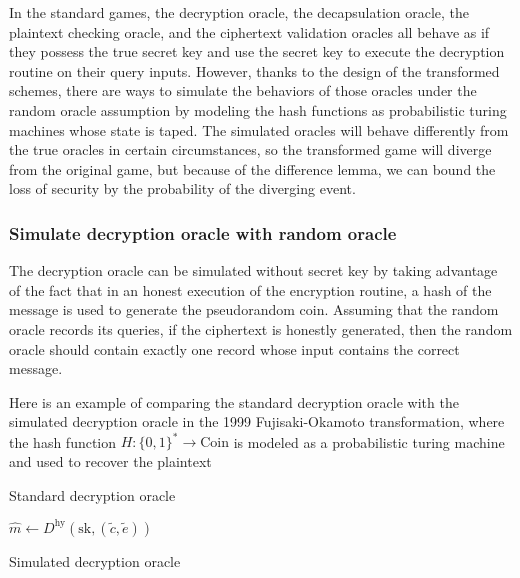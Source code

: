 \documentclass{article}
\begin{document}
In the standard games, the decryption oracle, the decapsulation oracle, the plaintext checking oracle, and the ciphertext validation oracles all behave as if they possess the true secret key and use the secret key to execute the decryption routine on their query inputs. However, thanks to the design of the transformed schemes, there are ways to simulate the behaviors of those oracles under the random oracle assumption by modeling the hash functions as probabilistic turing machines whose state is taped. The simulated oracles will behave differently from the true oracles in certain circumstances, so the transformed game will diverge from the original game, but because of the difference lemma, we can bound the loss of security by the probability of the diverging event.

\subsubsection{Simulate decryption oracle with random oracle}\label{simulate-dec-oracle}
The decryption oracle can be simulated without secret key by taking advantage of the fact that in an honest execution of the encryption routine, a hash of the message is used to generate the pseudorandom coin. Assuming that the random oracle records its queries, if the ciphertext is honestly generated, then the random oracle should contain exactly one record whose input contains the correct message.

Here is an example of comparing the standard decryption oracle with the simulated decryption oracle in the 1999 Fujisaki-Okamoto transformation, where the hash function $H: \{0, 1\}^\ast \rightarrow \text{Coin}$ is modeled as a probabilistic turing machine and used to recover the plaintext

\begin{multicols}{2}
    \begin{algorithm}[H]
        \SetAlgoLined
        \caption{Standard decryption oracle}
        $\hat{m} \leftarrow D^\text{hy}(\text{sk}, (\tilde{c}, \tilde{e}))$\;
    \end{algorithm}


    \columnbreak

    \begin{algorithm}[H]
        \SetAlgoLined
        \caption{Simulated decryption oracle}
        \Return{$\bot$}\;
    \end{algorithm}
\end{multicols}
\end{document}

